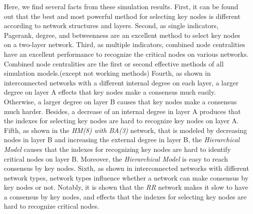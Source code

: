 Here, we find several facts from these simulation results. First, it can be found out that the best and most powerful method for selecting key nodes is different according to network structures and layers. Second, as single indicators, Pagerank, degree, and betweenness are an excellent method to select key nodes on a two-layer network. Third, as multiple indicators, combined node centralities have an excellent performance to recognize the critical nodes on various networks. Combined node centralities are the first or second effective methods of all simulation models.(except not working methods) Fourth, as shown in interconnected networks with a different internal degree on each layer, a larger degree on layer A effects that key nodes make a consensus much easily. Otherwise, a larger degree on layer B causes that key nodes make a consensus much harder. Besides, a decrease of an internal degree in layer A produces that the indexes for selecting key nodes are hard to recognize key nodes on layer A. Fifth, as shown in the \textit{HM(8) with BA(3)} network, that is modeled by decreasing nodes in layer B and increasing the external degree in layer B,  the \textit{Hierarchical Model} causes that the indexes for recognizing key nodes are hard to identify critical nodes on layer B.  Moreover, the \textit{Hierarchical Model} is easy to reach consensus by key nodes. Sixth, as shown in interconnected networks with different network types, network types influence whether a network can make consensus by key nodes or not. Notably, it is shown that the \textit{RR} network makes it slow to have a consensus by key nodes, and effects that the indexes for selecting key nodes are hard to recognize critical nodes.


